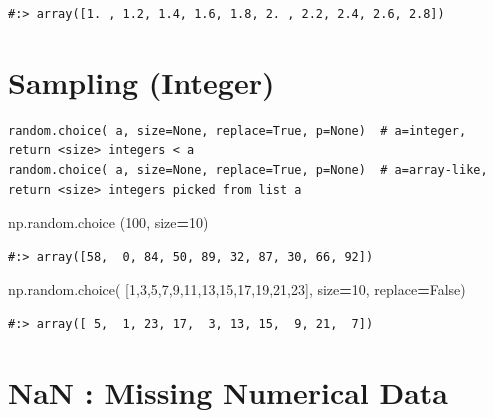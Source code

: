 \documentclass[
]{book}
\newenvironment{Shaded}{\begin{snugshade}}{\end{snugshade}}
\newcommand{\DecValTok}[1]{\textcolor[rgb]{0.06,0.06,0.06}{#1}}
\newcommand{\NormalTok}[1]{#1}
\newcommand{\OperatorTok}[1]{\textcolor[rgb]{0.43,0.43,0.43}{\textbf{#1}}}
\newcommand{\VariableTok}[1]{\textcolor[rgb]{0,0,0}{#1}}
\begin{document}
\begin{verbatim}
#:> array([1. , 1.2, 1.4, 1.6, 1.8, 2. , 2.2, 2.4, 2.6, 2.8])
\end{verbatim}

\hypertarget{sampling-integer}{%
\section{Sampling (Integer)}\label{sampling-integer}}

\begin{verbatim}
random.choice( a, size=None, replace=True, p=None)  # a=integer, return <size> integers < a
random.choice( a, size=None, replace=True, p=None)  # a=array-like, return <size> integers picked from list a
\end{verbatim}

\begin{Shaded}
\begin{Highlighting}[]
\NormalTok{np.random.choice (}\DecValTok{100}\NormalTok{, size}\OperatorTok{=}\DecValTok{10}\NormalTok{)}
\end{Highlighting}
\end{Shaded}

\begin{verbatim}
#:> array([58,  0, 84, 50, 89, 32, 87, 30, 66, 92])
\end{verbatim}

\begin{Shaded}
\begin{Highlighting}[]
\NormalTok{np.random.choice( [}\DecValTok{1}\NormalTok{,}\DecValTok{3}\NormalTok{,}\DecValTok{5}\NormalTok{,}\DecValTok{7}\NormalTok{,}\DecValTok{9}\NormalTok{,}\DecValTok{11}\NormalTok{,}\DecValTok{13}\NormalTok{,}\DecValTok{15}\NormalTok{,}\DecValTok{17}\NormalTok{,}\DecValTok{19}\NormalTok{,}\DecValTok{21}\NormalTok{,}\DecValTok{23}\NormalTok{], size}\OperatorTok{=}\DecValTok{10}\NormalTok{, replace}\OperatorTok{=}\VariableTok{False}\NormalTok{)}
\end{Highlighting}
\end{Shaded}

\begin{verbatim}
#:> array([ 5,  1, 23, 17,  3, 13, 15,  9, 21,  7])
\end{verbatim}

\hypertarget{nan-missing-numerical-data}{%
\section{NaN : Missing Numerical Data}\label{nan-missing-numerical-data}}
\end{document}
